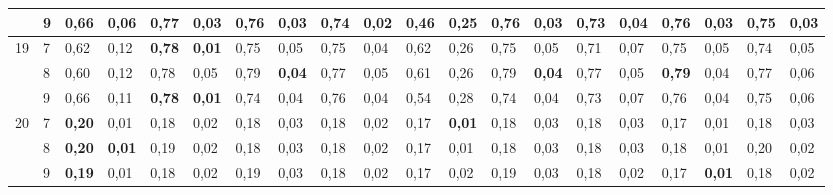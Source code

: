 \documentclass[conference]{IEEEtran}
\begin{document}
\begin{table}[]
\begin{tabular}{|cl|ll|ll|ll|ll|ll|ll|ll|ll|ll|}
		\multicolumn{1}{|c|}{} & 9 & \multicolumn{1}{l|}{0,66} & 0,06 & \multicolumn{1}{l|}{\textbf{0,77}} & 0,03 & \multicolumn{1}{l|}{0,76} & 0,03 & \multicolumn{1}{l|}{0,74} & \textbf{0,02} & \multicolumn{1}{l|}{0,46} & 0,25 & \multicolumn{1}{l|}{0,76} & 0,03 & \multicolumn{1}{l|}{0,73} & 0,04 & \multicolumn{1}{l|}{0,76} & 0,03 & \multicolumn{1}{l|}{0,75} & 0,03 \\ \hline
		\multicolumn{1}{|c|}{\multirow{3}{*}{19}} & 7 & \multicolumn{1}{l|}{0,62} & 0,12 & \multicolumn{1}{l|}{\textbf{0,78}} & \textbf{0,01} & \multicolumn{1}{l|}{0,75} & 0,05 & \multicolumn{1}{l|}{0,75} & 0,04 & \multicolumn{1}{l|}{0,62} & 0,26 & \multicolumn{1}{l|}{0,75} & 0,05 & \multicolumn{1}{l|}{0,71} & 0,07 & \multicolumn{1}{l|}{0,75} & 0,05 & \multicolumn{1}{l|}{0,74} & 0,05 \\ \cline{2-20} 
		\multicolumn{1}{|c|}{} & 8 & \multicolumn{1}{l|}{0,60} & 0,12 & \multicolumn{1}{l|}{0,78} & 0,05 & \multicolumn{1}{l|}{0,79} & \textbf{0,04} & \multicolumn{1}{l|}{0,77} & 0,05 & \multicolumn{1}{l|}{0,61} & 0,26 & \multicolumn{1}{l|}{0,79} & \textbf{0,04} & \multicolumn{1}{l|}{0,77} & 0,05 & \multicolumn{1}{l|}{\textbf{0,79}} & 0,04 & \multicolumn{1}{l|}{0,77} & 0,06 \\ \cline{2-20} 
		\multicolumn{1}{|c|}{} & 9 & \multicolumn{1}{l|}{0,66} & 0,11 & \multicolumn{1}{l|}{\textbf{0,78}} & \textbf{0,01} & \multicolumn{1}{l|}{0,74} & 0,04 & \multicolumn{1}{l|}{0,76} & 0,04 & \multicolumn{1}{l|}{0,54} & 0,28 & \multicolumn{1}{l|}{0,74} & 0,04 & \multicolumn{1}{l|}{0,73} & 0,07 & \multicolumn{1}{l|}{0,76} & 0,04 & \multicolumn{1}{l|}{0,75} & 0,06 \\ \hline
		\multicolumn{1}{|c|}{\multirow{3}{*}{20}} & 7 & \multicolumn{1}{l|}{\textbf{0,20}} & 0,01 & \multicolumn{1}{l|}{0,18} & 0,02 & \multicolumn{1}{l|}{0,18} & 0,03 & \multicolumn{1}{l|}{0,18} & 0,02 & \multicolumn{1}{l|}{0,17} & \textbf{0,01} & \multicolumn{1}{l|}{0,18} & 0,03 & \multicolumn{1}{l|}{0,18} & 0,03 & \multicolumn{1}{l|}{0,17} & 0,01 & \multicolumn{1}{l|}{0,18} & 0,03 \\ \cline{2-20} 
		\multicolumn{1}{|c|}{} & 8 & \multicolumn{1}{l|}{\textbf{0,20}} & \textbf{0,01} & \multicolumn{1}{l|}{0,19} & 0,02 & \multicolumn{1}{l|}{0,18} & 0,03 & \multicolumn{1}{l|}{0,18} & 0,02 & \multicolumn{1}{l|}{0,17} & 0,01 & \multicolumn{1}{l|}{0,18} & 0,03 & \multicolumn{1}{l|}{0,18} & 0,03 & \multicolumn{1}{l|}{0,18} & 0,01 & \multicolumn{1}{l|}{0,20} & 0,02 \\ \cline{2-20} 
		\multicolumn{1}{|c|}{} & 9 & \multicolumn{1}{l|}{\textbf{0,19}} & 0,01 & \multicolumn{1}{l|}{0,18} & 0,02 & \multicolumn{1}{l|}{0,19} & 0,03 & \multicolumn{1}{l|}{0,18} & 0,02 & \multicolumn{1}{l|}{0,17} & 0,02 & \multicolumn{1}{l|}{0,19} & 0,03 & \multicolumn{1}{l|}{0,18} & 0,02 & \multicolumn{1}{l|}{0,17} & \textbf{0,01} & \multicolumn{1}{l|}{0,18} & 0,02 \\ \hline
	\end{tabular}
\end{table}
\end{document}
